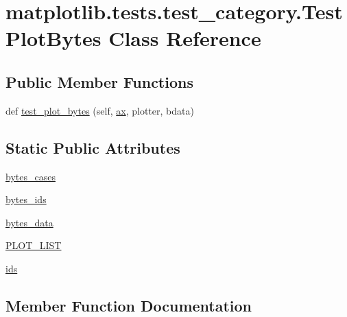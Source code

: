 \hypertarget{classmatplotlib_1_1tests_1_1test__category_1_1TestPlotBytes}{}\section{matplotlib.\+tests.\+test\+\_\+category.\+Test\+Plot\+Bytes Class Reference}
\label{classmatplotlib_1_1tests_1_1test__category_1_1TestPlotBytes}
\subsection*{Public Member Functions}
\begin{DoxyCompactItemize}
\item 
def \hyperlink{classmatplotlib_1_1tests_1_1test__category_1_1TestPlotBytes_ac37542d84f85d1eee0336710c8872944}{test\+\_\+plot\+\_\+bytes} (self, \hyperlink{namespacematplotlib_1_1tests_1_1test__category_ac4a78c2ee1d8720275b6d0ca5dee3c1c}{ax}, plotter, bdata)
\end{DoxyCompactItemize}
\subsection*{Static Public Attributes}
\begin{DoxyCompactItemize}
\item 
\hyperlink{classmatplotlib_1_1tests_1_1test__category_1_1TestPlotBytes_ac6c3f699d4eea097d1b81fc71c06ab7f}{bytes\+\_\+cases}
\item 
\hyperlink{classmatplotlib_1_1tests_1_1test__category_1_1TestPlotBytes_aedeaab93d4e587a4a254aed6c1661362}{bytes\+\_\+ids}
\item 
\hyperlink{classmatplotlib_1_1tests_1_1test__category_1_1TestPlotBytes_a0501ee11228bac094322a9714388b3bd}{bytes\+\_\+data}
\item 
\hyperlink{classmatplotlib_1_1tests_1_1test__category_1_1TestPlotBytes_aac7025c6d9e429ebb44f05300feba0bd}{P\+L\+O\+T\+\_\+\+L\+I\+ST}
\item 
\hyperlink{classmatplotlib_1_1tests_1_1test__category_1_1TestPlotBytes_ad434585058a97f48e0017bf194cae68f}{ids}
\end{DoxyCompactItemize}


\subsection{Member Function Documentation}
\mbox{\label{classmatplotlib_1_1tests_1_1test__category_1_1TestPlotBytes_ac37542d84f85d1eee0336710c8872944}} 
